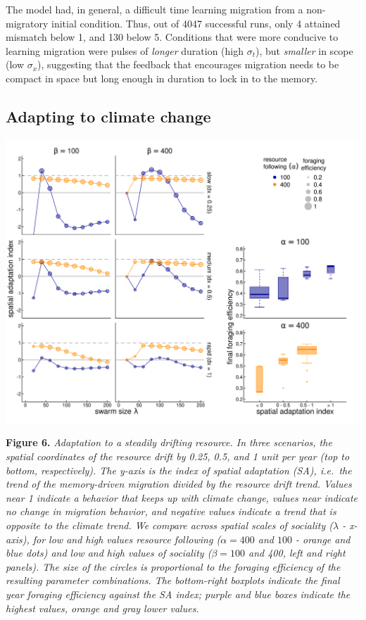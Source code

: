 \documentclass[12pt]{article}
\begin{document}
The model had, in general, a difficult time learning migration from a
non-migratory initial condition. Thus, out of 4047 successful runs, only
4 attained mismatch below 1, and 130 below 5. Conditions that were more
conducive to learning migration were pulses of \emph{longer} duration
(high \(\sigma_t\)), but \emph{smaller} in scope (low \(\sigma_x\)),
suggesting that the feedback that encourages migration needs to be
compact in space but long enough in duration to lock in to the memory.

\hypertarget{adapting-to-climate-change}{%
\subsection{Adapting to climate
change}\label{adapting-to-climate-change}}

\includegraphics{figures/SpatialClimateChange.png}

\textbf{Figure 6.} \emph{Adaptation to a steadily drifting resource. In
three scenarios, the spatial coordinates of the resource drift by 0.25,
0.5, and 1 unit per year (top to bottom, respectively). The y-axis is
the index of spatial adaptation (SA), i.e.~the trend of the
memory-driven migration divided by the resource drift trend. Values near
1 indicate a behavior that keeps up with climate change, values near
indicate no change in migration behavior, and negative values indicate a
trend that is opposite to the climate trend. We compare across spatial
scales of sociality (\(\lambda\) - x-axis), for low and high values
resource following (\(\alpha = 400\) and \(100\) - orange and blue dots)
and low and high values of sociality (\(\beta = 100\) and 400, left and
right panels). The size of the circles is proportional to the foraging
efficiency of the resulting parameter combinations. The bottom-right
boxplots indicate the final year foraging efficiency against the SA
index; purple and blue boxes indicate the highest values, orange and
gray lower values.}
\end{document}
